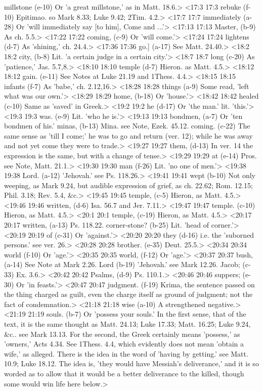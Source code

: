   millstone (e-10)  Or 'a great millstone,' as in Matt. 18.6.>
<17:3 17:3  rebuke (f-10)  Epitimao. so Mark 8.33; Luke 9.42; 2Tim. 4.2.>
<17:7 17:7  immediately (a-28)  Or 'will immediately say [to him], Come and ...'>
<17:13 17:13  Master, (b-9)  As ch. 5.5.>
<17:22 17:22  coming, (c-9)  Or 'will come.'>
<17:24 17:24  lightens (d-7)  As 'shining,' ch. 24.4.>
<17:36 17:36  go.] (a-17)  See Matt. 24.40.>
<18:2 18:2  city, (b-8)  Lit. 'a certain judge in a certain city.'>
<18:7 18:7  long (c-20)  As 'patience,' Jas. 5.7,8.>
<18:10 18:10  temple (d-7)  Hieron. as Matt. 4.5.>
<18:12 18:12  gain. (e-11)  See Notes at Luke 21.19 and 1Thess. 4.4.>
<18:15 18:15  infants (f-7)  As 'babe,' ch. 2.12,16.>
<18:28 18:28  things (a-9)  Some read, 'left what was our own.'>
<18:29 18:29  home, (b-18)  Or 'house.'>
<18:42 18:42  healed (c-10)  Same as 'saved' in Greek.>
<19:2 19:2  he (d-17)  Or 'the man.' lit. 'this.'>
<19:3 19:3  was. (e-9)  Lit. 'who he is.'>
<19:13 19:13  bondmen, (a-7)  Or 'ten bondmen of his.'
  minas, (b-13)  Mina. see Note, Ezek. 45.12.
  coming. (c-22)  The same sense as 'till I come;' he was to go and return  (ver. 12); while he was away and not yet come they were to  trade.>
<19:27 19:27  them, (d-13)  In ver. 14 the expression is the same, but with a change of  tense.>
<19:29 19:29  at (e-14)  Pros. see Note, Matt. 21.1.>
<19:30 19:30  man (f-26)  Lit. 'no one of men.'>
<19:38 19:38  Lord. (a-12)  'Jehovah.' see Ps. 118.26.>
<19:41 19:41  wept (b-10)  Not only weeping, as Mark 9.24, but audible expression of  grief, as ch. 22.62; Rom. 12.15; Phil. 3.18; Rev. 5.4, &c.>
<19:45 19:45  temple, (c-5) Hieron, as Matt. 4.5.>
<19:46 19:46  written, (d-6)  Isa. 56.7 and Jer. 7.11.>
<19:47 19:47  temple. (c-10) Hieron, as Matt. 4.5.>
<20:1 20:1  temple, (c-19)  Hieron, as Matt. 4.5.>
<20:17 20:17  written, (a-13)  Ps. 118.22.
  corner-stone? (b-25)  Lit. 'head of corner.'>
<20:19 20:19  of (c-31)  Or 'against.'>
<20:20 20:20  they (d-16)  i.e. the 'suborned persons.' see ver. 26.>
<20:28 20:28  brother. (e-35)  Deut. 25.5.>
<20:34 20:34  world (f-10) Or 'age.'>
<20:35 20:35  world, (f-12)  Or 'age.'>
<20:37 20:37  bush, (a-14)  See Note at Mark 2.26.
  Lord (b-19)  'Jehovah.' see Mark 12.26.
  Jacob; (c-33)  Ex. 3.6.>
<20:42 20:42  Psalms, (d-9)  Ps. 110.1.>
<20:46 20:46  suppers; (e-30)  Or 'in feasts.'>
<20:47 20:47  judgment. (f-19)  Krima, the sentence passed on the thing charged as guilt,  even the charge itself as ground of judgment; not the fact of  condemnation.>
<21:18 21:18  wise (a-10)  A strengthened negative.>
<21:19 21:19  souls. (b-7)  Or 'possess your souls.' In the first sense, that of the  text, it is the same thought as Matt. 24.13; Luke 17.33; Matt.  16.25; Luke 9.24, &c.. see Mark 13.13. For the second, the  Greek certainly means 'possess,' as 'owners,' Acts 4.34.  See 1Thess. 4.4, which evidently does not mean 'obtain a wife,' as  alleged. There is the idea in the word of 'having by getting.'  see Matt. 10.9; Luke 18.12. The idea is, 'they would have  Messiah's deliverance,' and it is so worded as to allow that it  would be a better deliverance to the killed, though some would  win life here below.>
